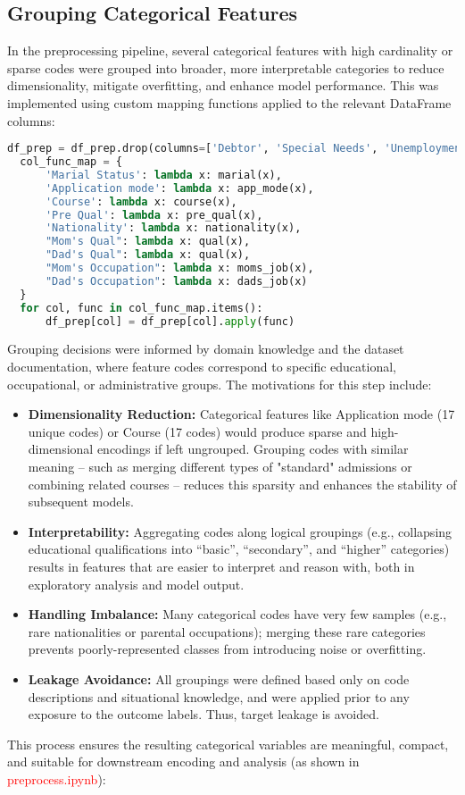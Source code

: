 \documentclass[twoside,final]{hcmut-report}
\begin{document}
\subsection*{Grouping Categorical Features}
In the preprocessing pipeline, several categorical features with high cardinality or sparse codes were grouped into broader, more interpretable categories to reduce dimensionality, mitigate overfitting, and enhance model performance. This was implemented using custom mapping functions applied to the relevant DataFrame columns:
\begin{lstlisting}[language=python]
  df_prep = df_prep.drop(columns=['Debtor', 'Special Needs', 'Unemployment rate', 'Inflation rate', 'GDP'])
  col_func_map = {
      'Marial Status': lambda x: marial(x),
      'Application mode': lambda x: app_mode(x),
      'Course': lambda x: course(x),
      'Pre Qual': lambda x: pre_qual(x),
      'Nationality': lambda x: nationality(x),
      "Mom's Qual": lambda x: qual(x),
      "Dad's Qual": lambda x: qual(x),
      "Mom's Occupation": lambda x: moms_job(x),
      "Dad's Occupation": lambda x: dads_job(x)
  }
  for col, func in col_func_map.items():
      df_prep[col] = df_prep[col].apply(func)
\end{lstlisting}
Grouping decisions were informed by domain knowledge and the dataset documentation, where feature codes correspond to specific educational, occupational, or administrative groups. The motivations for this step include:
\begin{itemize}
  \item \textbf{Dimensionality Reduction:} Categorical features like Application mode (17 unique codes) or Course (17 codes) would produce sparse and high-dimensional encodings if left ungrouped. Grouping codes with similar meaning -- such as merging different types of "standard" admissions or combining related courses -- reduces this sparsity and enhances the stability of subsequent models.
  \item \textbf{Interpretability:} Aggregating codes along logical groupings (e.g., collapsing educational qualifications into ``basic'', ``secondary'', and ``higher'' categories) results in features that are easier to interpret and reason with, both in exploratory analysis and model output.
  \item \textbf{Handling Imbalance:} Many categorical codes have very few samples (e.g., rare nationalities or parental occupations); merging these rare categories prevents poorly-represented classes from introducing noise or overfitting.
  \item \textbf{Leakage Avoidance:} All groupings were defined based only on code descriptions and situational knowledge, and were applied prior to any exposure to the outcome labels. Thus, target leakage is avoided.
\end{itemize}
This process ensures the resulting categorical variables are meaningful, compact, and suitable for downstream encoding and analysis (as shown in \textcolor{red}{preprocess.ipynb}):
\end{document}
